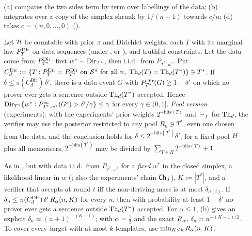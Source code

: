 \noindent (a) compares the two sides term by term over labellings of the data; (b) integrates over a copy of the simplex shrunk by $1/(n+1)$ towards $c/n$; (d) takes $c=(n,0,\dots,0)$ ().

\begin{theorem}\label{thm:sound:avg}
Let $\mathcal{H}$ be countable with prior $\pi$ and Dirichlet weights, each $T$ with its marginal law $P^{\mathrm{Dir}}_{T}$ on data sequences (under \Lzero, \Lone{} or \Ltwo), and truthful constraints. Let the data come from $P^{\mathrm{Dir}}_{T^*}$: first $w^*\sim\mathrm{Dir}_{T^*}$, then i.i.d.\ from $P_{T^*,w^*}$. Put $C^{\mathrm{Dir}}_d:=\{T:P^{\mathrm{Dir}}_{T}=P^{\mathrm{Dir}}_{T^*}\text{ on }\mathcal S^n\text{ for all }n,\ \mathrm{Th}_d(T)=\mathrm{Th}_d(T^*)\}\ni T^*$. If $\delta\le\pi(C^{\mathrm{Dir}}_d)\,\delta'$, there is a data event $G$ with $P^{\mathrm{Dir}}_{T^*}(G)\ge1-\delta'$ on which no prover ever gets a sentence outside $\mathrm{Th}_d(T^*)$ accepted. Hence $\mathrm{Dir}_{T^*}\{w^*:P^\infty_{T^*,w^*}(G^c)>\delta'/\gamma\}\le\gamma$ for every $\gamma\in(0,1]$.
\emph{Pool version} (experiments): with the experiments' prior weights $2^{-\mathrm{bits}(T)}$ and $\vdash_J$ for $\mathrm{Th}_d$, the verifier may use the posterior restricted to any pool $R_n\ni T^*$, even one chosen from the data, and the conclusion holds for $\delta\le2^{-\mathrm{bits}(T^*)}\delta'$; for a fixed pool $H$ plus all memorisers, $2^{-\mathrm{bits}(T^*)}$ may be divided by $\sum_{T\in H}2^{-\mathrm{bits}(T)}+1$.
\end{theorem}

\begin{theorem}\label{thm:sound:shrink}
As in , but with data i.i.d.\ from $P_{T^*,w^*}$ for a \emph{fixed} $w^*$ in the closed simplex, a likelihood linear in $w$ (\Lzero; also the experiments' chain $\mathsf{Ch}_{J}$), $K:=|T^*|$, and a verifier that accepts at round $t$ iff the non-deriving mass is at most $\delta_{n(t)}$. If $\delta_n\le\pi(C^{\mathrm{Dir}}_d)\,\delta'\,R_{\alpha}(n,K)$ for every $n$, then with probability at least $1-\delta'$ no prover ever gets a sentence outside $\mathrm{Th}_d(T^*)$ accepted. For $\alpha\le1$, (b) gives an explicit $\delta_n\propto(n+1)^{-(K-1)}$; with $\alpha=\tfrac12$ and the exact $R_{\alpha}$, $\delta_n\asymp n^{-(K-1)/2}$. To cover every target with at most $k$ templates, use $\min_{K\le k}R_{\alpha}(n,K)$.
\end{theorem}

